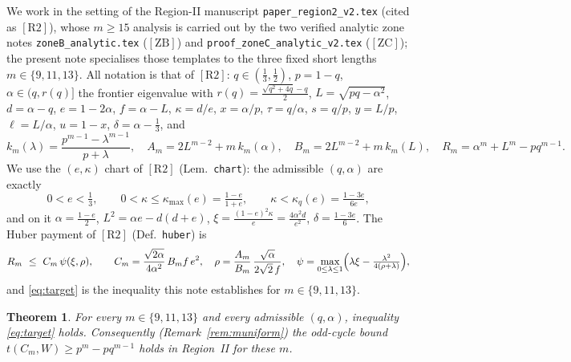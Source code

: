 \documentclass[11pt]{amsart}
\newtheorem{theorem}{Theorem}[section]
\newcommand{\kq}{\kappa_q}
\newcommand{\kmx}{\kappa_{\max}}
\newcommand{\RII}{[\textrm{R2}]}
\newcommand{\ZB}{[\textrm{ZB}]}
\newcommand{\ZC}{[\textrm{ZC}]}
\begin{document}
We work in the setting of the Region-II manuscript
\texttt{paper\_region2\_v2.tex} (cited as $\RII$), whose $m\ge15$ analysis is
carried out by the two verified analytic zone notes
\texttt{zoneB\_analytic.tex} ($\ZB$) and
\texttt{proof\_zoneC\_analytic\_v2.tex} ($\ZC$); the present note specialises
those templates to the three fixed short lengths $m\in\{9,11,13\}$.  All
notation is that of $\RII$: $q\in(\tfrac13,\tfrac12)$, $p=1-q$,
$\alpha\in(q,r(q)]$ the frontier eigenvalue with
$r(q)=\tfrac{\sqrt{q^2+4q}-q}2$, $L=\sqrt{pq-\alpha^2}$, $d=\alpha-q$,
$e=1-2\alpha$, $f=\alpha-L$, $\kappa=d/e$, $x=\alpha/p$, $\tau=q/\alpha$,
$s=q/p$, $y=L/p$, $\ell=L/\alpha$, $u=1-x$, $\delta=\alpha-\tfrac13$, and
\begin{equation}\label{eq:defs}
 k_m(\lambda)=\frac{p^{m-1}-\lambda^{m-1}}{p+\lambda},\quad
 A_m=2L^{m-2}+m\,k_m(\alpha),\quad
 B_m=2L^{m-2}+m\,k_m(L),\quad
 R_m=\alpha^m+L^m-pq^{m-1}.
\end{equation}
We use the $(e,\kappa)$ chart of $\RII$ (Lem.~\texttt{chart}): the admissible
$(q,\alpha)$ are exactly
\begin{equation}\label{eq:chart}
 0<e<\tfrac13,\qquad 0<\kappa\le\kmx(e)=\tfrac{1-e}{1+e},\qquad
 \kappa<\kq(e)=\tfrac{1-3e}{6e},
\end{equation}
and on it $\alpha=\tfrac{1-e}2$, $L^2=\alpha e-d(d+e)$,
$\xi=\tfrac{(1-e)^2\kappa}{e}=\tfrac{4\alpha^2 d}{e^2}$,
$\delta=\tfrac{1-3e}6$.  The Huber payment of $\RII$ (Def.~\texttt{huber}) is
\begin{equation}\label{eq:target}
 R_m\ \le\ C_m\,\psi(\xi,\rho),\qquad
 C_m=\frac{\sqrt{2\alpha}}{4\alpha^2}\,B_m f\,e^2,\quad
 \rho=\frac{A_m}{B_m}\,\frac{\sqrt\alpha}{2\sqrt2\,f},\quad
 \psi=\max_{0\le\lambda\le1}\Bigl(\lambda\xi-\tfrac{\lambda^2}{4(\rho+\lambda)}\Bigr),
\end{equation}
and \eqref{eq:target} is the inequality this note establishes for
$m\in\{9,11,13\}$.

\begin{theorem}\label{thm:main}
For every $m\in\{9,11,13\}$ and every admissible $(q,\alpha)$,
inequality \eqref{eq:target} holds.  Consequently
(Remark~\ref{rem:muniform}) the odd-cycle bound $t(C_m,W)\ge p^m-pq^{m-1}$
holds in Region~II for these $m$.
\end{theorem}
\end{document}
